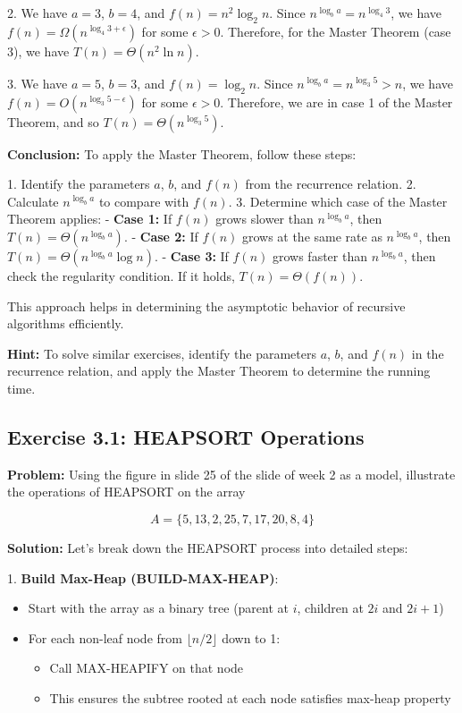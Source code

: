 2. We have $a = 3$, $b = 4$, and $f(n) = n^2 \log_2 n$. Since $n^{\log_b a} = n^{\log_4 3}$, we have $f(n) = \Omega(n^{\log_4 3 + \epsilon})$ for some $\epsilon > 0$. Therefore, for the Master Theorem (case 3), we have $T(n) = \Theta(n^2 \ln n)$.

3. We have $a = 5$, $b = 3$, and $f(n) = \log_2 n$. Since $n^{\log_b a} = n^{\log_3 5} > n$, we have $f(n) = O(n^{\log_3 5 - \epsilon})$ for some $\epsilon > 0$. Therefore, we are in case 1 of the Master Theorem, and so $T(n) = \Theta(n^{\log_3 5})$. 

\textbf{Conclusion:} To apply the Master Theorem, follow these steps:

1. Identify the parameters $a$, $b$, and $f(n)$ from the recurrence relation.
2. Calculate $n^{\log_b a}$ to compare with $f(n)$.
3. Determine which case of the Master Theorem applies:
   - \textbf{Case 1:} If $f(n)$ grows slower than $n^{\log_b a}$, then $T(n) = \Theta(n^{\log_b a})$.
   - \textbf{Case 2:} If $f(n)$ grows at the same rate as $n^{\log_b a}$, then $T(n) = \Theta(n^{\log_b a} \log n)$.
   - \textbf{Case 3:} If $f(n)$ grows faster than $n^{\log_b a}$, then check the regularity condition. If it holds, $T(n) = \Theta(f(n))$.

This approach helps in determining the asymptotic behavior of recursive algorithms efficiently.

\textbf{Hint:} To solve similar exercises, identify the parameters $a$, $b$, and $f(n)$ in the recurrence relation, and apply the Master Theorem to determine the running time.

\subsection{Exercise 3.1: HEAPSORT Operations}
\textbf{Problem:} Using the figure in slide 25 of the slide of week 2 as a model, illustrate the operations of HEAPSORT on the array

\[ A = \{5, 13, 2, 25, 7, 17, 20, 8, 4\} \]

\vspace{0.5em}
\textbf{Solution:} Let's break down the HEAPSORT process into detailed steps:

1. \textbf{Build Max-Heap (BUILD-MAX-HEAP)}:
   \begin{itemize}
      \item Start with the array as a binary tree (parent at $i$, children at $2i$ and $2i+1$)
      \item For each non-leaf node from $\lfloor n/2 \rfloor$ down to 1:
         \begin{itemize}
            \item Call MAX-HEAPIFY on that node
            \item This ensures the subtree rooted at each node satisfies max-heap property
         \end{itemize}
   \end{itemize}

